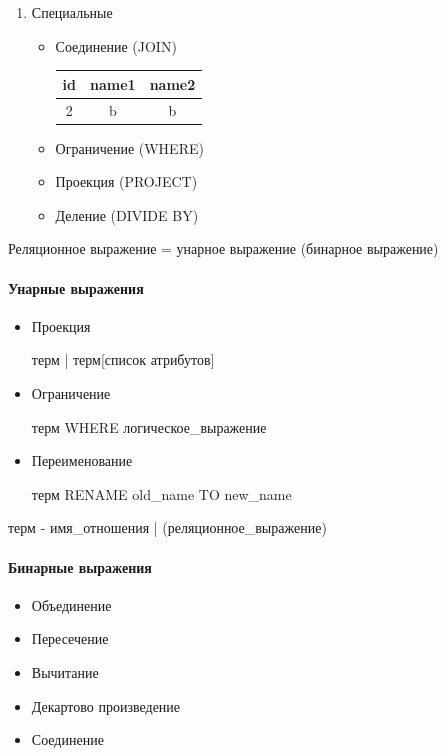 \documentclass[a4paper, 14pt]{report}
\begin{document}
\begin{enumerate}
    \item Специальные

        \begin{itemize}
            \item Соединение (JOIN)

                \begin{tabular}{|c|c|c|}
                    \hline
                    id & name1 & name2\\
                    \hline
                    2 & b & b \\
                    \hline
                \end{tabular}

            \item Ограничение (WHERE)
            \item Проекция (PROJECT)
            \item Деление (DIVIDE BY)
        \end{itemize}
\end{enumerate}

Реляционное выражение = унарное выражение (бинарное выражение)

\paragraph{Унарные выражения}

\begin{itemize}
    \item Проекция

        терм | терм[список атрибутов]

    \item Ограничение

        терм WHERE логическое\_выражение

    \item Переименование

        терм RENAME old\_name TO new\_name

\end{itemize}

терм - имя\_отношения | (реляционное\_выражение)

\paragraph{Бинарные выражения}

\begin{itemize}
    \item Объединение
    \item Пересечение
    \item Вычитание
    \item Декартово произведение
    \item Соединение
\end{itemize}
\end{document}
